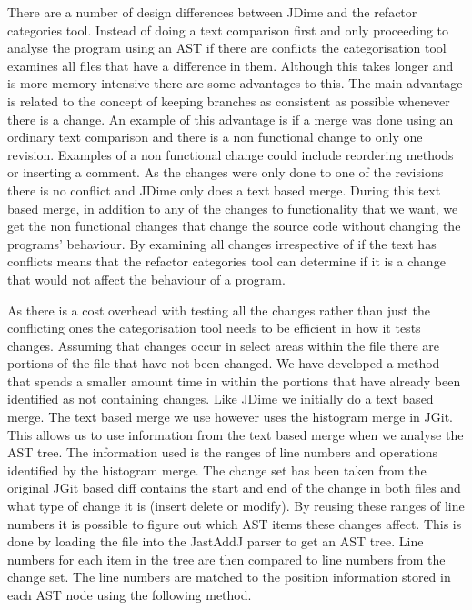 
% 

There are a number of design differences between JDime and the refactor categories tool.  Instead of doing a text comparison first and only proceeding to analyse the program using an AST if there are conflicts the categorisation tool examines all files that have a difference in them.  Although this takes longer and is more memory intensive there are some advantages to this. The main advantage is related to the concept of keeping branches as consistent as possible whenever there is a change. An example of this advantage is if a merge was done using an ordinary text comparison and there is a non functional change to only one revision. Examples of a non functional change could include reordering methods or inserting a comment.  As the changes were only done to one of the revisions there is no conflict and JDime only does a text based merge.  During this text based merge, in addition to any of the changes to functionality that we want, we get the non functional changes that change the source code without changing the programs' behaviour. By examining all changes irrespective of if the text has conflicts means that the refactor categories tool can determine if it is a change that would not affect the behaviour of a program.

As there is a cost overhead with testing all the changes rather than just the conflicting ones the categorisation tool needs to be efficient in how it tests changes.  Assuming that changes occur in select areas within the file there are portions of the file that have not been changed.  We have developed a method that spends a smaller amount time in  within the portions that have already been identified as not containing changes.  Like JDime we initially do a text based merge.  The text based merge we use however uses the histogram merge in JGit.  This allows us to use information from the text based merge when we analyse the AST tree.  The information used is the ranges of line numbers and operations identified by the histogram merge. The change set has been taken from the original JGit based diff contains the start and end of the change in both files and what type of change it is (insert delete or modify).  By reusing these ranges of line numbers it is possible to figure out which AST items these changes affect. This is done by loading the file into the JastAddJ parser to get an AST tree. Line numbers for each item in the tree are then compared to line numbers from the change set. The line numbers are matched to the position information stored in each AST node using the following method.

